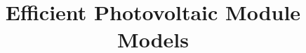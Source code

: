 \documentclass[twocolumn,letterpaper]{article}
\begin{document}
\date{}

\title{\Large\textbf{Efficient Photovoltaic Module Models} }	



\maketitle

\thispagestyle{empty}








\end{document}
